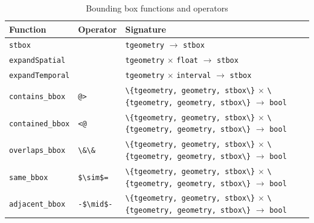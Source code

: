 \begin{table}[htb]
    \centering
    \begin{tabularx}{\textwidth}{|l|l|X|}
    \hline
    \textbf{Function}   & \textbf{Operator} & \textbf{Signature} \\ 
    \hline
    \lstinline+stbox+               & & \lstinline+tgeometry+ $\rightarrow$ \lstinline+stbox+\\
    \hline
    \lstinline+expandSpatial+       & & \lstinline+tgeometry+ $\times$ \lstinline+float+ $\rightarrow$ \lstinline+stbox+\\
    \hline
    \lstinline+expandTemporal+      & & \lstinline+tgeometry+ $\times$ \lstinline+interval+ $\rightarrow$ \lstinline+stbox+ \\
    \hline
    \lstinline+contains_bbox+      & \lstinline+@>+ & \lstinline+\{tgeometry, geometry, stbox\}+ $\times$ \lstinline+\{tgeometry, geometry, stbox\}+ $\rightarrow$ \lstinline+bool+ \\
    \hline
    \lstinline+contained_bbox+     & \lstinline+<@+ & \lstinline+\{tgeometry, geometry, stbox\}+ $\times$ \lstinline+\{tgeometry, geometry, stbox\}+ $\rightarrow$ \lstinline+bool+ \\
    \hline
    \lstinline+overlaps_bbox+      & \lstinline+\&\&+ & \lstinline+\{tgeometry, geometry, stbox\}+ $\times$ \lstinline+\{tgeometry, geometry, stbox\}+ $\rightarrow$ \lstinline+bool+ \\
    \hline
    \lstinline+same_bbox+          & \lstinline+$\sim$=+ & \lstinline+\{tgeometry, geometry, stbox\}+ $\times$ \lstinline+\{tgeometry, geometry, stbox\}+ $\rightarrow$ \lstinline+bool+ \\
    \hline
    \lstinline+adjacent_bbox+      & \lstinline+-$\mid$-+ & \lstinline+\{tgeometry, geometry, stbox\}+ $\times$ \lstinline+\{tgeometry, geometry, stbox\}+ $\rightarrow$ \lstinline+bool+ \\
    \hline
    \end{tabularx}
    \caption{Bounding box functions and operators}
    \label{table:bbox_funcs}
\end{table}

